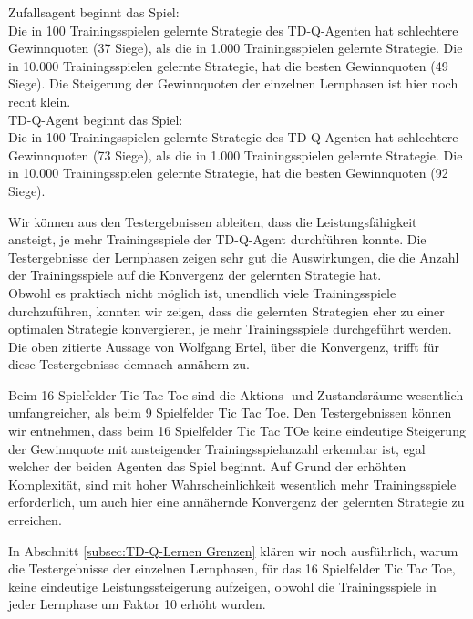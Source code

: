 
Zufallsagent beginnt das Spiel: \\
Die in 100 Trainingsspielen gelernte Strategie des TD-Q-Agenten hat schlechtere Gewinnquoten (37 Siege), als die in 1.000 Trainingsspielen gelernte Strategie. Die in 10.000 Trainingsspielen gelernte Strategie, hat die besten Gewinnquoten (49 Siege). Die Steigerung der Gewinnquoten der einzelnen Lernphasen ist hier noch recht klein. \\

TD-Q-Agent beginnt das Spiel: \\
Die in 100 Trainingsspielen gelernte Strategie des TD-Q-Agenten hat schlechtere Gewinnquoten (73 Siege), als die in 1.000 Trainingsspielen gelernte Strategie. Die in 10.000 Trainingsspielen gelernte Strategie, hat die besten Gewinnquoten (92 Siege).  

Wir können aus den Testergebnissen ableiten, dass die Leistungsfähigkeit ansteigt, je mehr Trainingsspiele der TD-Q-Agent durchführen konnte. Die Testergebnisse der Lernphasen zeigen sehr gut die Auswirkungen, die die Anzahl der Trainingsspiele auf die Konvergenz der gelernten Strategie hat. \\

Obwohl es praktisch nicht möglich ist, unendlich viele Trainingsspiele durchzuführen, konnten wir zeigen, dass die gelernten Strategien eher zu einer optimalen Strategie konvergieren, je mehr Trainingsspiele durchgeführt werden. Die oben zitierte Aussage von Wolfgang Ertel, über die Konvergenz, trifft für diese Testergebnisse demnach annähern zu. \\


Beim 16 Spielfelder Tic Tac Toe sind die Aktions- und Zustandsräume wesentlich umfangreicher, als beim 9 Spielfelder Tic Tac Toe. Den Testergebnissen können wir entnehmen, dass beim 16 Spielfelder Tic Tac TOe keine eindeutige Steigerung der Gewinnquote mit ansteigender Trainingsspielanzahl erkennbar ist, egal welcher der beiden Agenten das Spiel beginnt. Auf Grund der erhöhten Komplexität, sind mit hoher Wahrscheinlichkeit wesentlich mehr Trainingsspiele erforderlich, um auch hier eine annähernde Konvergenz der gelernten Strategie zu erreichen.

In Abschnitt \ref{subsec:TD-Q-Lernen Grenzen} klären wir noch ausführlich, warum die Testergebnisse der einzelnen Lernphasen, für das 16 Spielfelder Tic Tac Toe, keine eindeutige Leistungssteigerung aufzeigen, obwohl die Trainingsspiele in jeder Lernphase um Faktor 10 erhöht wurden. \\

